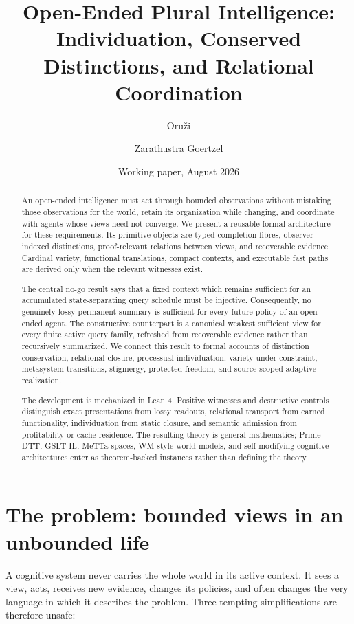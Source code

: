 \documentclass[11pt]{article}
\title{Open-Ended Plural Intelligence:\\
Individuation, Conserved Distinctions, and Relational Coordination}
\author{Oru\v{z}i \and Zarathustra Goertzel}
\date{Working paper, August 2026}
\begin{document}
\maketitle

\begin{abstract}
An open-ended intelligence must act through bounded observations without mistaking
those observations for the world, retain its organization while changing, and
coordinate with agents whose views need not converge.  We present a reusable formal
architecture for these requirements.  Its primitive objects are typed completion
fibres, observer-indexed distinctions, proof-relevant relations between views, and
recoverable evidence.  Cardinal variety, functional translations, compact contexts,
and executable fast paths are derived only when the relevant witnesses exist.

The central no-go result says that a fixed context which remains sufficient for an
accumulated state-separating query schedule must be injective.  Consequently, no
genuinely lossy permanent summary is sufficient for every future policy of an
open-ended agent.  The constructive counterpart is a canonical weakest sufficient
view for every finite active query family, refreshed from recoverable evidence rather
than recursively summarized.  We connect this result to formal accounts of
distinction conservation, relational closure, processual individuation,
variety-under-constraint, metasystem transitions, stigmergy, protected freedom, and
source-scoped adaptive realization.

The development is mechanized in Lean 4.  Positive witnesses and destructive
controls distinguish exact presentations from lossy readouts, relational transport
from earned functionality, individuation from static closure, and semantic admission
from profitability or cache residence.  The resulting theory is general mathematics;
Prime DTT, GSLT-IL, MeTTa spaces, WM-style world models, and self-modifying cognitive
architectures enter as theorem-backed instances rather than defining the theory.
\end{abstract}

\section{The problem: bounded views in an unbounded life}

A cognitive system never carries the whole world in its active context.  It sees a
view, acts, receives new evidence, changes its policies, and often changes the very
language in which it describes the problem.  Three tempting simplifications are
therefore unsafe:
\end{document}
